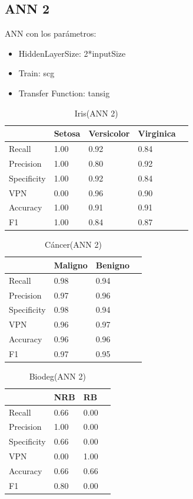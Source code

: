 \documentclass[a4paper,openwrite,12pt]{article}
\begin{document}
\subsection{ANN 2}
ANN con los parámetros:
\begin{itemize}
    \item HiddenLayerSize: 2*inputSize
    \item Train: scg
    \item Transfer Function: tansig
\end{itemize}

\begin{table}[H]
\centering
\begin{tabular}{@{}lllll@{}}
\toprule
            & Setosa & Versicolor & Virginica &  \\ \midrule
Recall      & 1.00   & 0.92       & 0.84      &  \\
Precision   & 1.00   & 0.80       & 0.92      &  \\
Specificity & 1.00   & 0.92       & 0.84      &  \\
VPN         & 0.00   & 0.96       & 0.90      &  \\
Accuracy    & 1.00   & 0.91       & 0.91      &  \\
F1          & 1.00   & 0.84       & 0.87      &  \\ \bottomrule
\end{tabular}
\caption{Iris(ANN 2)}
\end{table}


\begin{table}[H]
\centering
\begin{tabular}{@{}llll@{}}
\toprule
            & Maligno & Benigno &  \\ \midrule
Recall      & 0.98    & 0.94    &  \\
Precision   & 0.97    & 0.96    &  \\
Specificity & 0.98    & 0.94    &  \\
VPN         & 0.96    & 0.97    &  \\
Accuracy    & 0.96    & 0.96    &  \\
F1          & 0.97    & 0.95    &  \\ \bottomrule
\end{tabular}
\caption{Cáncer(ANN 2)}
\end{table}

\begin{table}[H]
\centering
\begin{tabular}{@{}llll@{}}
\toprule
            & NRB &   RB &  \\ \midrule
Recall      & 0.66    & 0.00    &  \\
Precision   & 1.00    & 0.00    &  \\
Specificity & 0.66    & 0.00    &  \\
VPN         & 0.00    & 1.00    &  \\
Accuracy    & 0.66    & 0.66    &  \\
F1          & 0.80    & 0.00    &  \\ \bottomrule
\end{tabular}
\caption{Biodeg(ANN 2)}
\end{table}
\end{document}
